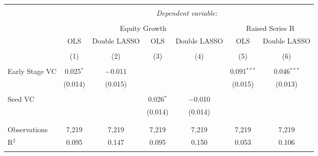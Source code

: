 
\begin{tabular}{@{\extracolsep{5pt}}lcccccc} 
\\[-1.8ex]\hline 
\hline \\[-1.8ex] 
 & \multicolumn{6}{c}{\textit{Dependent variable:}} \\ 
\cline{2-7} 
\\[-1.8ex] & \multicolumn{4}{c}{Equity Growth} & \multicolumn{2}{c}{Raised Series B} \\ 
 & OLS & Double LASSO & OLS & Double LASSO & OLS & Double LASSO \\ 
\\[-1.8ex] & (1) & (2) & (3) & (4) & (5) & (6)\\ 
\hline \\[-1.8ex] 
 Early Stage VC & 0.025$^{*}$ & $-$0.011 &  &  & 0.091$^{***}$ & 0.046$^{***}$ \\ 
  & (0.014) & (0.015) &  &  & (0.015) & (0.013) \\ 
  & & & & & & \\ 
 Seed VC &  &  & 0.026$^{*}$ & $-$0.010 &  &  \\ 
  &  &  & (0.014) & (0.014) &  &  \\ 
  & & & & & & \\ 
\hline \\[-1.8ex] 
Observations & 7,219 & 7,219 & 7,219 & 7,219 & 7,219 & 7,219 \\ 
R$^{2}$ & 0.095 & 0.147 & 0.095 & 0.150 & 0.053 & 0.106 \\ 
\hline 
\hline \\[-1.8ex] 
\end{tabular} 

